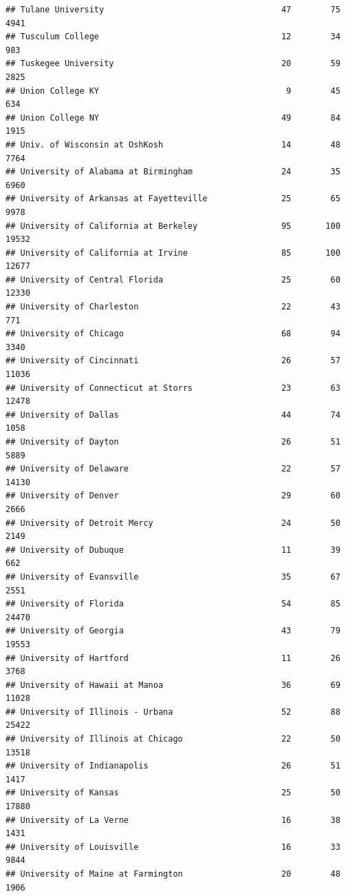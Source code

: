 \documentclass[
]{article}
\begin{document}
\begin{verbatim}
## Tulane University                                    47        75        4941
## Tusculum College                                     12        34         983
## Tuskegee University                                  20        59        2825
## Union College KY                                      9        45         634
## Union College NY                                     49        84        1915
## Univ. of Wisconsin at OshKosh                        14        48        7764
## University of Alabama at Birmingham                  24        35        6960
## University of Arkansas at Fayetteville               25        65        9978
## University of California at Berkeley                 95       100       19532
## University of California at Irvine                   85       100       12677
## University of Central Florida                        25        60       12330
## University of Charleston                             22        43         771
## University of Chicago                                68        94        3340
## University of Cincinnati                             26        57       11036
## University of Connecticut at Storrs                  23        63       12478
## University of Dallas                                 44        74        1058
## University of Dayton                                 26        51        5889
## University of Delaware                               22        57       14130
## University of Denver                                 29        60        2666
## University of Detroit Mercy                          24        50        2149
## University of Dubuque                                11        39         662
## University of Evansville                             35        67        2551
## University of Florida                                54        85       24470
## University of Georgia                                43        79       19553
## University of Hartford                               11        26        3768
## University of Hawaii at Manoa                        36        69       11028
## University of Illinois - Urbana                      52        88       25422
## University of Illinois at Chicago                    22        50       13518
## University of Indianapolis                           26        51        1417
## University of Kansas                                 25        50       17880
## University of La Verne                               16        38        1431
## University of Louisville                             16        33        9844
## University of Maine at Farmington                    20        48        1906

\end{verbatim}
\end{document}

